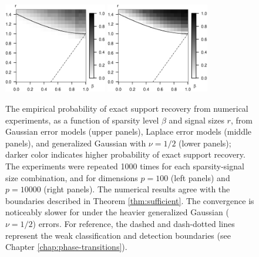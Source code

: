 \begin{figure}
      \includegraphics[width=0.4\textwidth]{./figures/simulated_phase_diagram_NLC_p100.eps}
      \includegraphics[width=0.4\textwidth]{./figures/simulated_phase_diagram_NLC_p10000.eps}
      \caption{The empirical probability of exact support recovery from numerical experiments, as a function of sparsity level $\beta$ and signal sizes $r$, 
      from Gaussian error models (upper panels), Laplace error models (middle panels), and generalized Gaussian with $\nu=1/2$ (lower panels); darker color indicates higher probability of exact support recovery. 
      The experiments were repeated 1000 times for each sparsity-signal size combination, and for dimensions $p=100$ (left panels) and $p=10000$ (right panels). 
      The numerical results agree with the boundaries described in Theorem \ref{thm:sufficient}. The convergence is noticeably slower for under the heavier 
      generalized Gaussian ($\nu=1/2$) errors.  For reference, the dashed and dash-dotted lines represent the weak classification and detection boundaries
       (see Chapter \ref{chap:phase-transitions}).
      \label{fig:phase-simulated}}
\end{figure}

